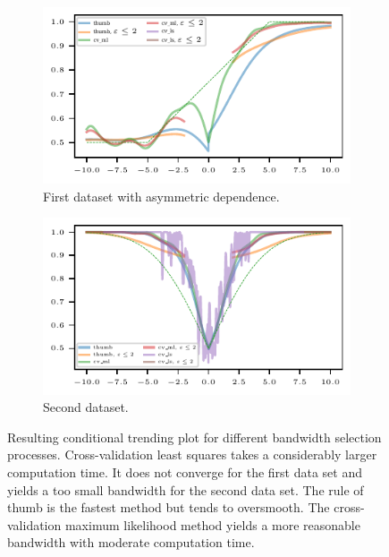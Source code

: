 \begin{figure}
    \centering
    \begin{subfigure}{.48\textwidth}
        \includegraphics{plots/illustrative_examples/cond_prob_plot_bw_asym_butterfly}
        \caption{First dataset with asymmetric dependence.}
    \end{subfigure}
    \begin{subfigure}{.48\textwidth}
        \includegraphics{plots/illustrative_examples/cond_prob_plot_bw_normal}
        \caption{Second dataset. }
    \end{subfigure}
    \caption{Resulting conditional trending plot for different bandwidth selection processes. Cross-validation least squares takes a considerably larger computation time. It does not converge for the first data set and yields a too small bandwidth for the second data set. The rule of thumb is the fastest method but tends to oversmooth. The cross-validation maximum likelihood method yields a more reasonable bandwidth with moderate computation time. }\label{fig:trending-cond-prob-bw}
\end{figure}

